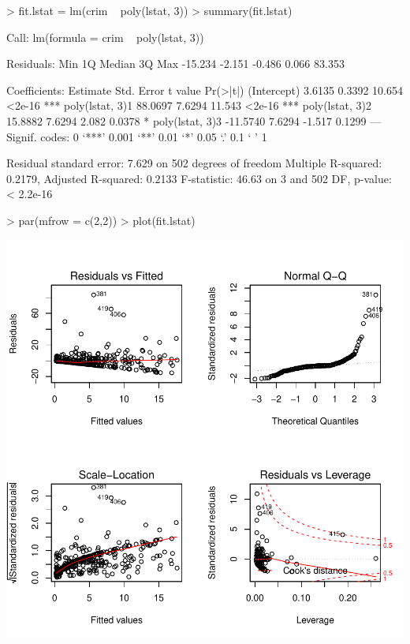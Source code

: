 \documentclass[a4paper]{article}
\begin{document}
\begin{Schunk}
\begin{Sinput}
> fit.lstat = lm(crim ~ poly(lstat, 3))
> summary(fit.lstat)
\end{Sinput}
\begin{Soutput}
Call:
lm(formula = crim ~ poly(lstat, 3))

Residuals:
    Min      1Q  Median      3Q     Max 
-15.234  -2.151  -0.486   0.066  83.353 

Coefficients:
                Estimate Std. Error t value Pr(>|t|)    
(Intercept)       3.6135     0.3392  10.654   <2e-16 ***
poly(lstat, 3)1  88.0697     7.6294  11.543   <2e-16 ***
poly(lstat, 3)2  15.8882     7.6294   2.082   0.0378 *  
poly(lstat, 3)3 -11.5740     7.6294  -1.517   0.1299    
---
Signif. codes:  0 ‘***’ 0.001 ‘**’ 0.01 ‘*’ 0.05 ‘.’ 0.1 ‘ ’ 1

Residual standard error: 7.629 on 502 degrees of freedom
Multiple R-squared:  0.2179,	Adjusted R-squared:  0.2133 
F-statistic: 46.63 on 3 and 502 DF,  p-value: < 2.2e-16
\end{Soutput}
\begin{Sinput}
> par(mfrow = c(2,2))
> plot(fit.lstat)
\end{Sinput}
\end{Schunk}
\includegraphics{mutivariblelm-lstat2}
\end{document}

